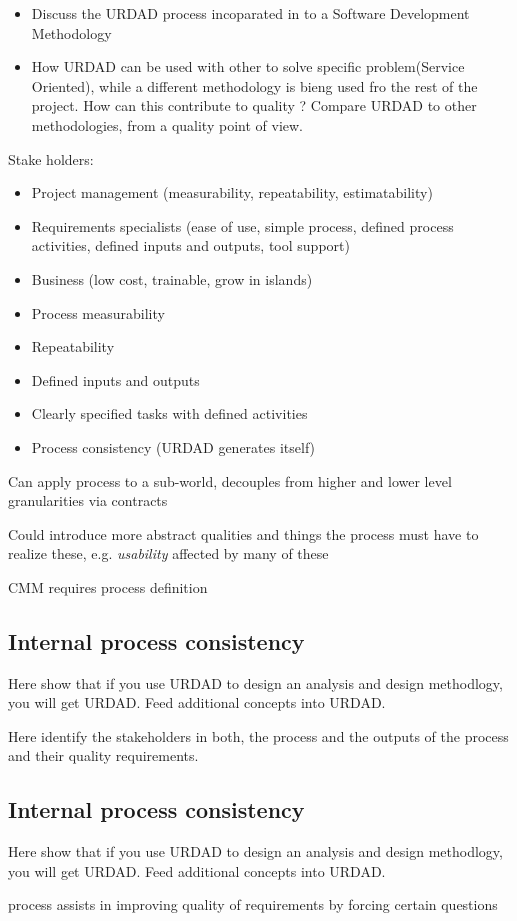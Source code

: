 \begin {itemize}
 \item Discuss the URDAD process incoparated in to a Software Development Methodology
 \item How URDAD can be used with other to solve specific problem(Service Oriented),
  while a different methodology is bieng used fro the rest of the project. How can this contribute to quality ?
  Compare URDAD to other methodologies, from a quality point of view.
\end {itemize}


\cite{berard_what_1995}

Stake holders:
\begin{itemize}
  \item Project management (measurability, repeatability, estimatability)
  \item Requirements specialists (ease of use, simple process, defined process activities, defined inputs and outputs, tool support)
  \item Business (low cost, trainable, grow in islands)
\end{itemize}


\begin{itemize}
  \item Process measurability
  \item Repeatability
  \item Defined inputs and outputs
  \item Clearly specified tasks with defined activities
  \item Process consistency (URDAD generates itself)
\end{itemize}

Can apply process to a sub-world, decouples from higher and lower level granularities via contracts

Could introduce more abstract qualities and things the process must have to realize these, e.g. \emph{usability} affected by many of these

CMM requires process definition


\subsection{Internal process consistency}


Here show that if you use URDAD to design an analysis and design methodlogy, you will get URDAD. Feed additional concepts into URDAD.

Here identify the stakeholders in both, the process and the outputs of the process and their quality requirements.


\subsection{Internal process consistency}

Here show that if you use URDAD to design an analysis and design methodlogy, you will get URDAD. Feed additional concepts into URDAD.

process assists in improving quality of requirements by forcing certain questions
